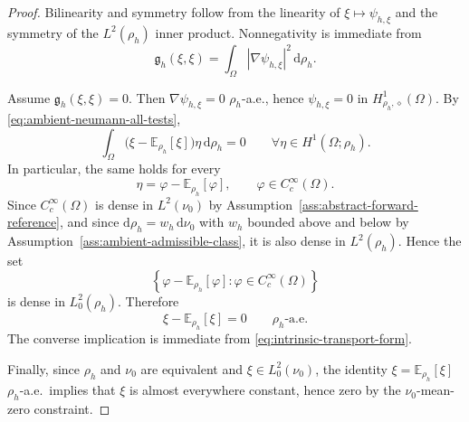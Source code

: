 \documentclass{article}
\theoremstyle{definition}
\renewcommand{\d}{\mathrm{d}}
\begin{document}
\begin{proof}
    Bilinearity and symmetry follow from the linearity of \(\xi\mapsto \psi_{h,\xi}\) and the
    symmetry of the \(L^2(\rho_h)\) inner product. Nonnegativity is immediate from
    \[
        \mathfrak g_h(\xi,\xi)=\int_\Omega |\nabla\psi_{h,\xi}|^2\,\d\rho_h.
    \]

    Assume \(\mathfrak g_h(\xi,\xi)=0\). Then \(\nabla\psi_{h,\xi}=0\) \(\rho_h\)-a.e., hence
    \(\psi_{h,\xi}=0\) in \(H^1_{\rho_h,\diamond}(\Omega)\). By
    \eqref{eq:ambient-neumann-all-tests},
    \[
        \int_\Omega
        \bigl(\xi-\mathbb E_{\rho_h}[\xi]\bigr)\eta\,\d\rho_h
        =0
        \qquad
        \forall \eta\in H^1(\Omega;\rho_h).
    \]
    In particular, the same holds for every
    \[
        \eta=\varphi-\mathbb E_{\rho_h}[\varphi],
        \qquad
        \varphi\in C_c^\infty(\Omega).
    \]
    Since \(C_c^\infty(\Omega)\) is dense in \(L^2(\nu_0)\) by
    Assumption~\ref{ass:abstract-forward-reference}, and since
    \(\d\rho_h=w_h\,\d\nu_0\) with \(w_h\) bounded above and below by
    Assumption~\ref{ass:ambient-admissible-class}, it is also dense in
    \(L^2(\rho_h)\). Hence the set
    \[
        \left\{
        \varphi-\mathbb E_{\rho_h}[\varphi]:\varphi\in C_c^\infty(\Omega)
        \right\}
    \]
    is dense in \(L^2_0(\rho_h)\). Therefore
    \[
        \xi-\mathbb E_{\rho_h}[\xi]=0
        \qquad
        \rho_h\text{-a.e.}
    \]
    The converse implication is immediate from \eqref{eq:intrinsic-transport-form}.

    Finally, since \(\rho_h\) and \(\nu_0\) are equivalent and \(\xi\in L^2_0(\nu_0)\), the identity
    \(\xi=\mathbb E_{\rho_h}[\xi]\) \(\rho_h\)-a.e.\ implies that \(\xi\) is almost everywhere constant,
    hence zero by the \(\nu_0\)-mean-zero constraint.
\end{proof}
\end{document}
